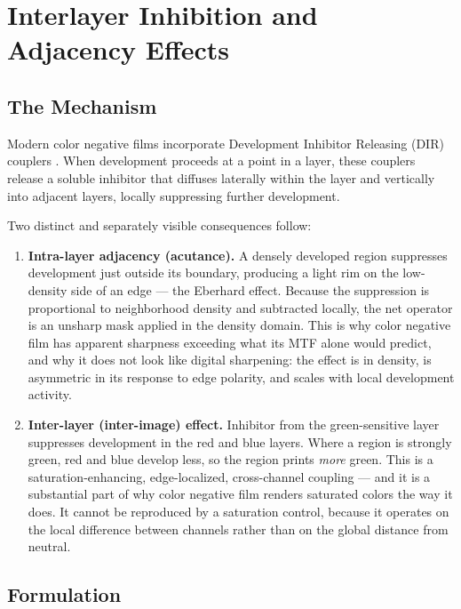 \section{Interlayer Inhibition and Adjacency Effects}
\label{sec:interlayer}

\subsection{The Mechanism}

Modern color negative films incorporate Development Inhibitor Releasing (DIR)
couplers \cite{james1977}. When development proceeds at a point in a layer, these couplers
release a soluble inhibitor that diffuses laterally within the layer and
vertically into adjacent layers, locally suppressing further development.

Two distinct and separately visible consequences follow:

\begin{enumerate}
\item \textbf{Intra-layer adjacency (acutance).} A densely developed region
suppresses development just outside its boundary, producing a light rim on the
low-density side of an edge --- the Eberhard effect. Because the suppression is
proportional to neighborhood density and subtracted locally, the net operator is
an unsharp mask applied in the density domain. This is why color negative film
has apparent sharpness exceeding what its MTF alone would predict, and why it
does not look like digital sharpening: the effect is in density, is asymmetric
in its response to edge polarity, and scales with local development activity.
\item \textbf{Inter-layer (inter-image) effect.} Inhibitor from the
green-sensitive layer suppresses development in the red and blue layers. Where a
region is strongly green, red and blue develop less, so the region prints
\emph{more} green. This is a saturation-enhancing, edge-localized, cross-channel
coupling --- and it is a substantial part of why color negative film renders
saturated colors the way it does. It cannot be reproduced by a saturation
control, because it operates on the local difference between channels rather
than on the global distance from neutral.
\end{enumerate}

\subsection{Formulation}

